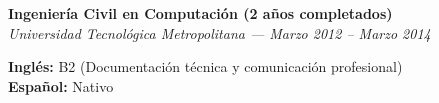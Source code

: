 \documentclass[10pt,letterpaper]{article}
\begin{document}
\vspace{0.2cm}

\noindent \textbf{Ingeniería Civil en Computación (2 años completados)} \\
\textit{Universidad Tecnológica Metropolitana — Marzo 2012 – Marzo 2014}

\vspace{0.4cm}


\vspace{0.3cm}

\noindent \textbf{Inglés:} B2 (Documentación técnica y comunicación profesional) \\
\noindent \textbf{Español:} Nativo
\end{document}
